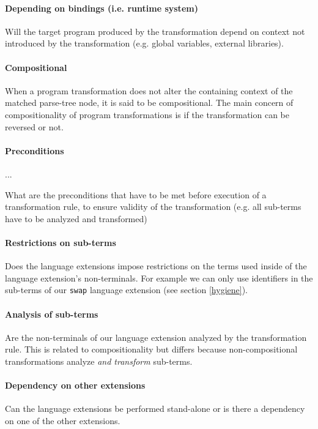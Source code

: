 \paragraph{Depending on bindings (i.e. runtime system)}
Will the target program produced by the transformation depend on context not introduced by the transformation (e.g. global variables, external libraries).

\paragraph{Compositional}
When a program transformation does not alter the containing context of the matched parse-tree node, it is said to be compositional. The main concern of compositionality of program transformations is if the transformation can be reversed or not.

\paragraph{Preconditions}

...

What are the preconditions that have to be met before execution of a transformation rule, to ensure validity of the transformation (e.g. all sub-terms have to be analyzed and transformed)

\paragraph{Restrictions on sub-terms}
Does the language extensions impose restrictions on the terms used inside of the language extension's non-terminals. For example we can only use identifiers in the sub-terms of our \lstinline$swap$ language extension (see section \ref{hygiene}).

\paragraph{Analysis of sub-terms}
Are the non-terminals of our language extension analyzed by the transformation rule. This is related to compositionality but differs because non-compositional transformations analyze \textit{and transform} sub-terms.

\paragraph{Dependency on other extensions}
Can the language extensions be performed stand-alone or is there a dependency on one of the other extensions.

